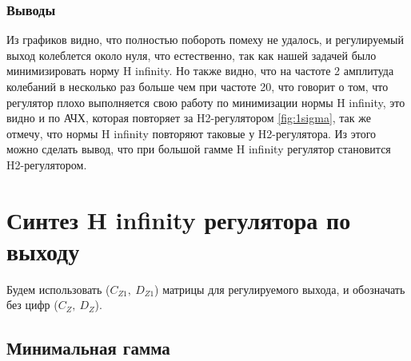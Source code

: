 \subsubsection{Выводы}

Из графиков видно, что полностью побороть помеху не удалось, и регулируемый выход 
колеблется около нуля, что естественно, так как нашей задачей было минимизировать норму H infinity. 
Но также видно, что на частоте 2 амплитуда колебаний в несколько раз больше чем при частоте 20,
что говорит о том, что регулятор плохо выполняется свою работу по минимизации нормы H infinity, это видно и по АЧХ, которая
повторяет за H2-регулятором \autoref{fig:1sigma}, так же отмечу, что
нормы H infinity повторяют таковые у H2-регулятора. Из этого можно сделать вывод, что
при большой гамме H infinity регулятор становится H2-регулятором.





\section{Синтез H infinity регулятора по выходу}

Будем использовать ($C_{Z1},\ D_{Z1}$) матрицы для регулируемого выхода, и обозначать
без цифр ($C_{Z},\ D_{Z}$). 

\subsection{Минимальная гамма}

